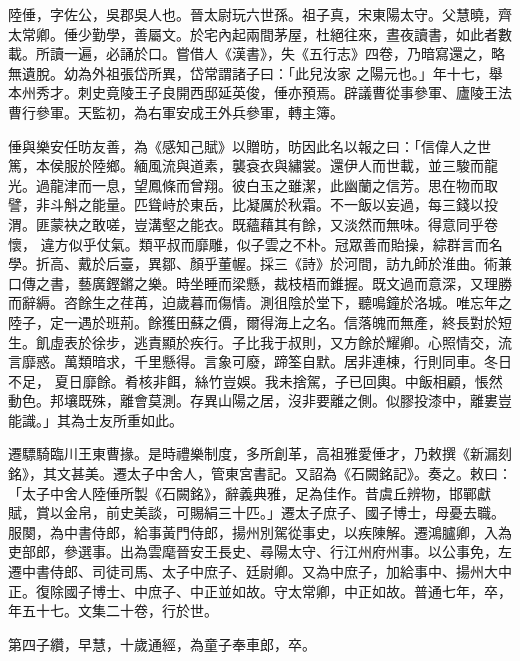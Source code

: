 
\begin{pinyinscope}

 陸倕，字佐公，吳郡吳人也。晉太尉玩六世孫。祖子真，宋東陽太守。父慧曉，齊太常卿。倕少勤學，善屬文。於宅內起兩間茅屋，杜絕往來，晝夜讀書，如此者數載。所讀一遍，必誦於口。嘗借人《漢書》，失《五行志》四卷，乃暗寫還之，略無遺脫。幼為外祖張岱所異，岱常謂諸子曰：「此兒汝家
 之陽元也。」年十七，舉本州秀才。刺史竟陵王子良開西邸延英俊，倕亦預焉。辟議曹從事參軍、廬陵王法曹行參軍。天監初，為右軍安成王外兵參軍，轉主簿。



 倕與樂安任昉友善，為《感知己賦》以贈昉，昉因此名以報之曰：「信偉人之世篤，本侯服於陸鄉。緬風流與道素，襲袞衣與繡裳。還伊人而世載，並三駿而龍光。過龍津而一息，望鳳條而曾翔。彼白玉之雖潔，此幽蘭之信芳。思在物而取譬，非斗斛之能量。匹聳峙於東岳，比凝厲於秋霜。不一飯以妄過，每三錢以投渭。匪蒙袂之敢嗟，豈溝壑之能衣。既蘊藉其有餘，又淡然而無味。得意同乎卷懷，
 違方似乎仗氣。類平叔而靡雕，似子雲之不朴。冠眾善而貽操，綜群言而名學。折高、戴於后臺，異鄒、顏乎董幄。採三《詩》於河間，訪九師於淮曲。術兼口傳之書，藝廣鏗鏘之樂。時坐睡而梁懸，裁枝梧而錐握。既文過而意深，又理勝而辭縟。咨餘生之荏苒，迫歲暮而傷情。測徂陰於堂下，聽鳴鐘於洛城。唯忘年之陸子，定一遇於班荊。餘獲田蘇之價，爾得海上之名。信落魄而無產，終長對於短生。飢虛表於徐步，逃責顯於疾行。子比我于叔則，又方餘於耀卿。心照情交，流言靡惑。萬類暗求，千里懸得。言象可廢，蹄筌自默。居非連棟，行則同車。冬日不足，
 夏日靡餘。肴核非餌，絲竹豈娛。我未捨駕，子已回輿。中飯相顧，悵然動色。邦壤既殊，離會莫測。存異山陽之居，沒非要離之側。似膠投漆中，離婁豈能識。」其為士友所重如此。



 遷驃騎臨川王東曹掾。是時禮樂制度，多所創革，高祖雅愛倕才，乃敕撰《新漏刻銘》，其文甚美。遷太子中舍人，管東宮書記。又詔為《石闕銘記》。奏之。敕曰：「太子中舍人陸倕所製《石闕銘》，辭義典雅，足為佳作。昔虞丘辨物，邯鄲獻賦，賞以金帛，前史美談，可賜絹三十匹。」遷太子庶子、國子博士，母憂去職。服闋，為中書侍郎，給事黃門侍郎，揚州別駕從事史，以疾陳解。遷鴻臚卿，入為
 吏部郎，參選事。出為雲麾晉安王長史、尋陽太守、行江州府州事。以公事免，左遷中書侍郎、司徒司馬、太子中庶子、廷尉卿。又為中庶子，加給事中、揚州大中正。復除國子博士、中庶子、中正並如故。守太常卿，中正如故。普通七年，卒，年五十七。文集二十卷，行於世。



 第四子纘，早慧，十歲通經，為童子奉車郎，卒。




\end{pinyinscope}
